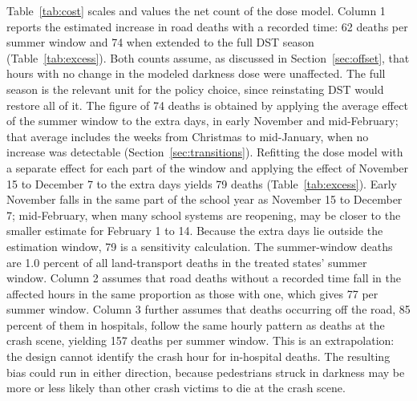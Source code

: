 Table~\ref{tab:cost} scales and values the net count of the dose model. Column 1 reports the estimated increase in road deaths with a recorded time: 62 deaths per summer window and 74 when extended to the full DST season (Table~\ref{tab:excess}). Both counts assume, as discussed in Section~\ref{sec:offset}, that hours with no change in the modeled darkness dose were unaffected. The full season is the relevant unit for the policy choice, since reinstating DST would restore all of it. The figure of 74 deaths is obtained by applying the average effect of the summer window to the extra days, in early November and mid-February; that average includes the weeks from Christmas to mid-January, when no increase was detectable (Section~\ref{sec:transitions}). Refitting the dose model with a separate effect for each part of the window and applying the effect of November 15 to December 7 to the extra days yields 79 deaths (Table~\ref{tab:excess}). Early November falls in the same part of the school year as November 15 to December 7; mid-February, when many school systems are reopening, may be closer to the smaller estimate for February 1 to 14. Because the extra days lie outside the estimation window, 79 is a sensitivity calculation. %
 The summer-window deaths are 1.0 percent of all land-transport deaths in the treated states' summer window. Column 2 assumes that road deaths without a recorded time fall in the affected hours in the same proportion as those with one, which gives 77 per summer window. Column 3 further assumes that deaths occurring off the road, 85 percent of them in hospitals, follow the same hourly pattern as deaths at the crash scene, yielding 157 deaths per summer window. This is an extrapolation: the design cannot identify the crash hour for in-hospital deaths. The resulting bias could run in either direction, because pedestrians struck in darkness may be more or less likely than other crash victims to die at the crash scene.

